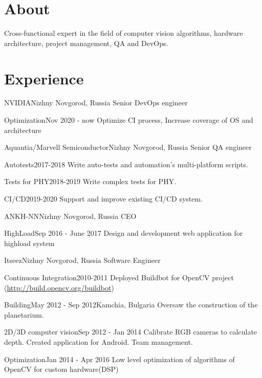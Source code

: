 \documentclass[11pt,a4paper]{moderncv}
\begin{document}
\maketitle

\section{About}
Cross-functional expert in the field of computer vision algorithms, hardware architecture, project management, QA and DevOps.

\section{Experience}
	{NVIDIA}{Nizhny Novgorod, Russia}{}{}
	{Senior DevOps engineer}

\cventry{}
	{Optimization}{Nov 2020 - now}{}{}
	{Optimize CI process, Increase coverage of OS and architecture}

	{Aquantia/Marvell Semiconductor}{Nizhny Novgorod, Russia}{}{}
	{Senior QA engineer}

\cventry{}
	{Autotests}{2017-2018}{}{}
	{Write auto-tests and automation's multi-platform scripts.}

\cventry{}
	{Tests for PHY}{2018-2019}{}{}
	{Write complex tests for PHY.}

\cventry{}
	{CI/CD}{2019-2020}{}{}
	{Support and improve existing CI/CD system.}

	{ANKH-NN}{Nizhny Novgorod, Russia}{}{}
	{CEO}

\cventry{}
	{HighLoad}{Sep 2016 - June 2017}{}{}
	{Design and development web application for highload system}

	{Itseez}{Nizhny Novgorod, Russia}{}{}
	{Software Engineer}

\cventry{}
	{Continuous Integration}{2010-2011}{}{}
	{Deployed Buildbot for OpenCV project (\url{http://build.opencv.org/buildbot})}

\cventry{}
	{Building}{May 2012 - Sep 2012}{Kamchia, Bulgaria}{}
	{Oversaw the construction of the planetarium.}

\cventry{}
	{2D/3D computer vision}{Sep 2012 - Jan 2014}{} {}
	{Calibrate RGB cameras to calculate depth. Created application for Android. Team management.}

\cventry{}
	{Optimization}{Jan 2014 - Apr 2016}{}{}
	{Low level optimization of algorithms of OpenCV for custom hardware(DSP)}
\end{document}
